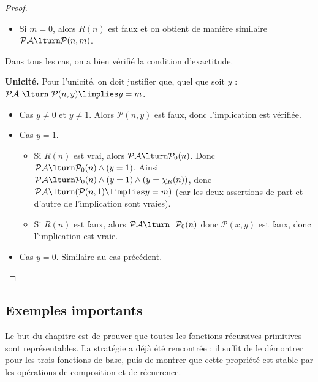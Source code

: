 \documentclass[11pt,class=report,crop=false]{standalone}
\begin{document}
\begin{proof}
\begin{itemize}
\begin{itemize}
        \item Si $m=0$, alors $R(n)$ est faux et on obtient de manière similaire $\mathcal{PA} \lturn \mathcal{P}(n, m)$.
    \end{itemize}
    Dans tous les cas, on a bien vérifié la condition d'exactitude.

    \medskip

    \textbf{Unicité.} 
    Pour l'unicité, on doit justifier que, quel que soit $y$ :
    $\mathcal{PA} \ \lturn \ \mathcal{P}(n,y) \limplies y = m$.
    
    \begin{itemize}
        \item Cas $y \neq 0$ et $y \neq 1$. Alors $\mathcal{P}(n,y)$ est faux, donc l'implication est vérifiée.

        \item Cas $y=1$.
        \begin{itemize}
            \item Si $R(n)$ est vrai, alors $\mathcal{PA} \lturn \mathcal{P}_0(n)$. Donc $\mathcal{PA} \lturn \mathcal{P}_0(n) \land (y=1)$.
            Ainsi $\mathcal{PA} \lturn \mathcal{P}_0(n) \land (y=1) \land (y = \chi_R(n))$, donc $\mathcal{PA} \lturn (\mathcal{P}(n,1) \limplies y=m)$ (car les deux assertions de part et d'autre de l'implication sont vraies).
            
            \item Si $R(n)$ est faux, alors $\mathcal{PA} \lturn \lnot\mathcal{P}_0(n)$ donc $\mathcal{P}(x,y)$ est faux, donc l'implication est vraie.
        \end{itemize}

        \item Cas $y=0$. Similaire au cas précédent.
    \end{itemize}
    \end{itemize}
    
\end{proof}


\subsection{Exemples importants} 

Le but du chapitre est de prouver que toutes les fonctions récursives primitives sont représentables. La stratégie a déjà été rencontrée : il suffit de le démontrer pour les trois fonctions de base, puis de montrer que cette propriété est stable par les opérations de composition et de récurrence.
\end{document}
